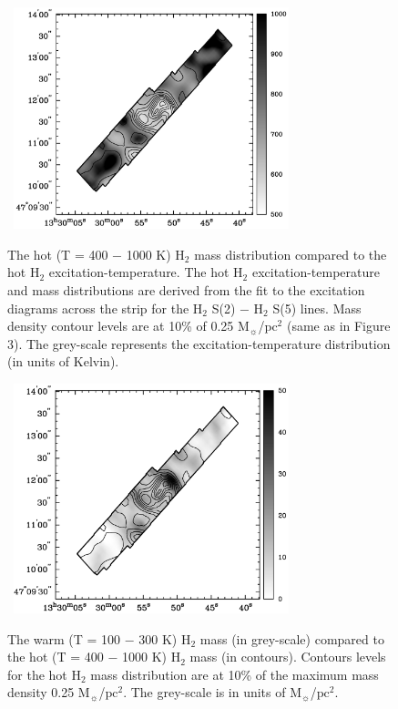 \documentclass[manuscript]{aastex}
\begin{document}
\clearpage
\begin{figure}[!h]
\centerline{\hbox{\hspace{0.0in}
\includegraphics[width=8cm,angle=0]{new_bw_hot_h2.jpg}}}
\caption{The hot (T = 400 $-$ 1000 K) $\mathrm{H_2}$ mass distribution compared to the hot $\mathrm{H_2}$ excitation-temperature.  The hot $\mathrm{H_2}$ excitation-temperature and mass distributions are derived from the fit to the excitation diagrams across the strip for the $\mathrm{H_2}$ S(2) $-$ $\mathrm{H_2}$ S(5) lines.  Mass density contour levels are at 10\% of 0.25 $\mathrm{M_\sun}$/$\mathrm{pc^2}$ (same as in Figure 3). 
The grey-scale represents the excitation-temperature distribution (in units of Kelvin).  %
\label{fig5}}
\end{figure}

\clearpage
\begin{figure}[!h]
\centerline{\hbox{\hspace{0.0in}
\includegraphics[width=8cm,angle=0]{new_bw_warm_v_hot.jpg}}}
\caption{The warm (T = 100 $-$ 300 K) $\mathrm{H_2}$ mass (in grey-scale) compared to the hot (T = 400 $-$ 1000 K) $\mathrm{H_2}$ mass (in contours).  Contours levels for the hot $\mathrm{H_2}$ mass distribution are at 10\% of the maximum mass density 0.25 $\mathrm{M_\sun}$/$\mathrm{pc^2}$. 
The grey-scale is in units of $\mathrm{M_\sun}$/$\mathrm{pc^2}$.
\label{fig6}}
\end{figure}
\end{document}
